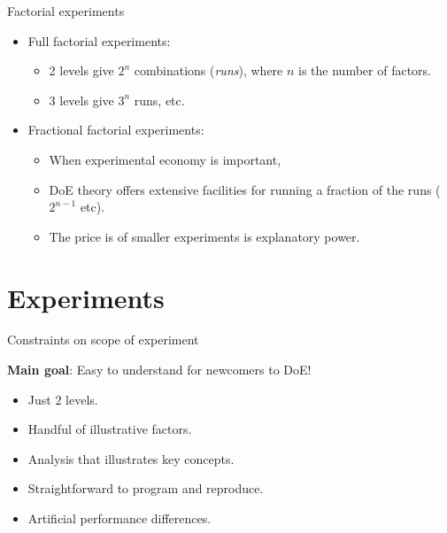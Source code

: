 \documentclass[english,usenames,dvipsnames,aspectratio=169]{beamer}
\begin{document}
\begin{frame}{Factorial experiments}

  \begin{itemize}
  \item Full factorial experiments:
    \begin{itemize}
    \item 2 levels give $2^n$ combinations (\emph{runs}), where $n$ is
      the number of factors.
    \item 3 levels give $3^n$ runs, etc.
    \end{itemize}
  \item Fractional factorial experiments:

    \begin{itemize}
    \item When experimental economy is important,
    \item DoE theory offers extensive facilities for running a
      fraction of the runs ($2^{n-1}$ etc).
    \item The price is of smaller experiments is explanatory power.
    \end{itemize}
  \end{itemize}
\end{frame}




\section{Experiments}

\begin{frame}{Constraints on scope of experiment}

\textbf{Main goal}: Easy to understand for newcomers to DoE!

\begin{itemize}
\item Just 2 levels.
\item Handful of illustrative factors.
\item Analysis that illustrates key concepts.
\item Straightforward to program and reproduce.
\item Artificial performance differences.
\end{itemize}

\end{frame}
\end{document}
